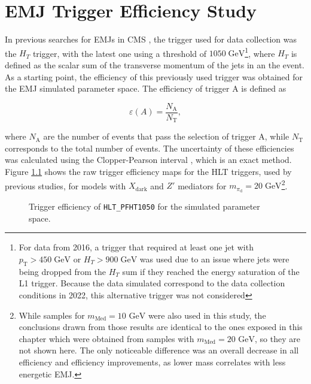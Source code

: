 \chapter{EMJ Trigger Efficiency Study}
\label{chap:trigeff}

In previous searches for EMJs in CMS \cite{cmscollaborationSearchNewParticles2019, cmscollaborationSearchNewPhysics2024}, the trigger used for data collection was the $H_T$ trigger, with the latest one using a threshold of $1050\;\text{GeV}$\footnote{For data from 2016, a trigger that required at least one jet with $p_\text{T} > 450\;\text{GeV}$ or $H_T > 900\;\text{GeV}$ was used due to an issue where jets were being dropped from the $H_T$ sum if they reached the energy saturation of the L1 trigger. Because the data simulated correspond to the data collection conditions in 2022, this alternative trigger was not considered}, where $H_T$ is defined as the scalar sum of the transverse momentum of the jets in an the event. As a starting point, the efficiency of this previously used trigger was obtained for the EMJ simulated parameter space. The efficiency of trigger A is defined as

\begin{equation}
    \varepsilon(A) = \frac{N_{\text{A}}}{N_\text{T}},
\end{equation}

\noindent where $N_{\text{A}}$ are the number of events that pass the selection of trigger A, while $N_\text{T}$ corresponds to the total number of events. The uncertainty of these efficiencies was calculated using the Clopper-Pearson interval \cite{orawoConfidenceIntervalsBinomial2021}, which is an exact method. Figure \ref{fig:ht1050} shows the raw trigger efficiency maps for the HLT triggers, used by previous studies, for models with $X_{\text{dark}}$ and $Z'$ mediators for $m_{\pi_{\text{d}}} = 20 \;\text{GeV}$\footnote{While samples for $m_{\text{Med}}=10 \text{ GeV}$ were also used in this study, the conclusions drawn from those results are identical to the ones exposed in this chapter which were obtained from samples with $m_{\text{Med}}=20 \text{ GeV}$, so they are not shown here. The only noticeable difference was an overall decrease in all efficiency and efficiency improvements, as lower mass correlates with less energetic EMJ.}.

\begin{figure}[h]
    \centering
    \begin{subfigure}{0.45\textwidth}
        
    \end{subfigure}
    \hfill
    \begin{subfigure}{0.45\textwidth}
        
    \end{subfigure}
    \caption{Trigger efficiency of \texttt{HLT\_PFHT1050} for the simulated parameter space.}
    \label{fig:ht1050}
\end{figure}

